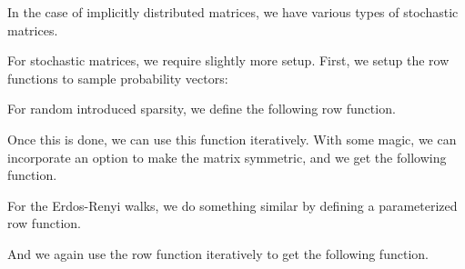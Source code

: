 In the case of implicitly distributed matrices, we have various types of stochastic matrices.


For stochastic matrices, we require slightly more setup. First, we setup the row functions to sample probability vectors:


For random introduced sparsity, we define the following row function.


Once this is done, we can use this function iteratively. With some magic, we can incorporate an option to make the matrix symmetric, and we get the following function.


\newpage
{}

For the Erdos-Renyi walks, we do something similar by defining a parameterized row function.


And we again use the row function iteratively to get the following function.


